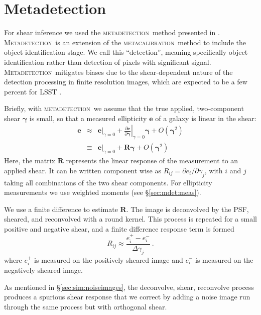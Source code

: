 \documentclass[iop, twocolappendix, appendixfloats, numberedappendix, apj]{hackemulateapj}
\newcommand{\mcal}{\textsc{metacalibration}}
\newcommand{\mdet}{\textsc{metadetection}}
\newcommand{\Mdet}{\textsc{Metadetection}}
\begin{document}
\section{Metadetection} \label{sec:mdet}

For shear inference we used the \mdet\ method presented in \cite{mdet20}.
\Mdet\ is an extension of the \mcal\ method
\citep{HuffMcal2017,SheldonMcal2017} to include the object identification
stage. We call this ``detection'', meaning specifically object identification
rather than detection of pixels with significant signal.  \Mdet\ mitigates
biases due to the shear-dependent nature of the detection processing in finite
resolution images, which are expected to be a few percent for LSST
\citep{mdet20}.

Briefly, with \mdet\ we assume that the true applied, two-component shear
$\boldsymbol{\gamma}$ is small, so that a measured ellipticity $\boldsymbol{e}$
of a galaxy is linear in the shear:
\begin{eqnarray} \label{eq:response}
\boldsymbol{e} & \approx & \left.\boldsymbol{e}\right|_{\gamma=0} +
                           \left.\frac{\partial \boldsymbol{e}}{\partial\boldsymbol\gamma}\right|_{\gamma=0} \boldsymbol\gamma +
                           O(\boldsymbol\gamma^2)\nonumber\\
               & \equiv  & \left.\boldsymbol{e}\right|_{\gamma=0} +
                           \boldsymbol{R} \boldsymbol\gamma +
                           O(\boldsymbol\gamma^2)
\end{eqnarray}
Here, the matrix $\boldsymbol{R}$ represents the linear response of the
measurement to an applied shear. It can be written component wise as
$R_{ij}=\partial e_i /\partial \gamma_j$, with $i$ and
$j$ taking all combinations of the two shear components.  For ellipticity
measurements we use weighted moments (see \S \ref{sec:mdet:meas}).

We use a finite difference to estimate $\boldsymbol{R}$.  The image is
deconvolved by the PSF, sheared, and reconvolved with a round kernel.  This
process is repeated for a small positive and negative shear, and a finite
difference response term is formed
\begin{equation}
R_{ij} \approx \frac{e_i^{+} - e_i^{-}}{\Delta\gamma_j}\ .
\end{equation}
where $e_i^{+}$ is measured on the positively sheared image and $e_i^{-}$ is
measured on the negatively sheared image.

As mentioned in \S \ref{sec:sim:noiseimages}, the deconvolve, shear, reconvolve
process produces a spurious shear response that we correct by adding a noise
image run through the same process but with orthogonal shear.
\end{document}
